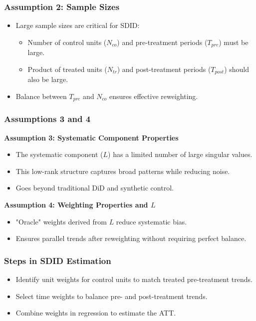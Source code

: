 \documentclass{beamer}
\begin{document}
\begin{frame}
\frametitle{Assumption 2: Sample Sizes}

\begin{itemize}
    \item Large sample sizes are critical for SDID:
    \begin{itemize}
        \item Number of control units ($N_{co}$) and pre-treatment periods ($T_{pre}$) must be large.
        \item Product of treated units ($N_{tr}$) and post-treatment periods ($T_{post}$) should also be large.
    \end{itemize}
    \item Balance between $T_{pre}$ and $N_{co}$ ensures effective reweighting.
\end{itemize}

\end{frame}


\begin{frame}
\frametitle{Assumptions 3 and 4}

\textbf{Assumption 3: Systematic Component Properties}
\begin{itemize}
    \item The systematic component ($L$) has a limited number of large singular values.
    \item This low-rank structure captures broad patterns while reducing noise.
    \item Goes beyond traditional DiD and synthetic control.
\end{itemize}

\vspace{0.5cm}

\textbf{Assumption 4: Weighting Properties and $L$}
\begin{itemize}
    \item "Oracle" weights derived from $L$ reduce systematic bias.
    \item Ensures parallel trends after reweighting without requiring perfect balance.
\end{itemize}

\end{frame}






\begin{frame}
\frametitle{Steps in SDID Estimation}

\begin{itemize}
    \item Identify unit weights for control units to match treated pre-treatment trends.
    \item Select time weights to balance pre- and post-treatment trends.
    \item Combine weights in regression to estimate the ATT.
\end{itemize}

\end{frame}
\end{document}
